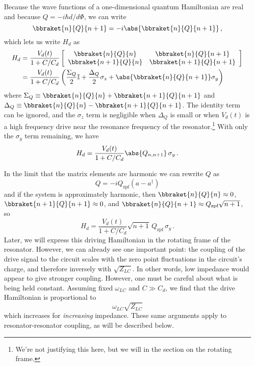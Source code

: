 Because the wave functions of a one-dimensional quantum Hamiltonian are real and because $Q = -i \hbar d/d\Phi$, we can write
\begin{equation*}
  \bbraket{n}{Q}{n+1} = -i \abs{\bbraket{n}{Q}{n+1}} \, ,
\end{equation*}
which lets us write $H_d$ as
\begin{align*}
  H_d
  &= \frac{V_d(t)}{1 + C / C_d}
    \left[ \begin{array}{cc}
      \bbraket{n}{Q}{n} & \bbraket{n}{Q}{n+1} \\
      \bbraket{n+1}{Q}{n} & \bbraket{n+1}{Q}{n+1}
    \end{array}\right] \\
  &= \frac{V_d(t)}{1 + C / C_d} \left(
      \frac{\Sigma_Q}{2} \mathbb{I}
    + \frac{\Delta_Q}{2} \sigma_z
    + \abs{\bbraket{n}{Q}{n+1}} \sigma_y
  \right)
\end{align*}
where $\Sigma_Q \equiv \bbraket{n}{Q}{n} + \bbraket{n+1}{Q}{n+1}$ and $\Delta_Q \equiv \bbraket{n}{Q}{n} - \bbraket{n+1}{Q}{n+1}$.
The identity term can be ignored, and the $\sigma_z$ term is negligible when $\Delta_Q$ is small or when $V_d(t)$ is a high frequency drive near the resonance frequency of the resonator.\footnote{We're not justifying this here, but we will in the section on the rotating frame.}
With only the $\sigma_y$ term remaining, we have
\begin{equation}
  H_d = \frac{V_d(t)}{1 + C/C_d} \abs{Q_{n,n+1}} \, \sigma_y \, .
\end{equation}

In the limit that the matrix elements are harmonic we can rewrite $Q$ as
\begin{equation*}
  Q = -i Q_\text{zpf} (a - a^\dagger)
\end{equation*}
and if the system is approximately harmonic, then $\bbraket{n}{Q}{n} \approx 0$, $\bbraket{n+1}{Q}{n+1} \approx 0$, and $\bbraket{n}{Q}{n+1} \approx Q_\text{zpf} \sqrt{n+1}$, so
\begin{equation*}
  H_d = \frac{V_d(t)}{1 + C / C_d} \sqrt{n+1} \, Q_\text{zpf} \, \sigma_y
  \, .
\end{equation*}
Later, we will express this driving Hamiltonian in the rotating frame of the resonator.
However, we can already see one important point: the coupling of the drive signal to the circuit scales with the zero point fluctuations in the circuit's charge, and therefore inversely with $\sqrt{Z_{LC}}$.
In other words, low impedance would appear to give stronger coupling.
However, one must be careful about what is being held constant.
Assuming fixed $\omega_{LC}$ and $C \gg C_d$, we find that the drive Hamiltonian is proportional to
\begin{equation*}
  \omega_{LC} \sqrt{Z_{LC}}
\end{equation*}
which increases for \emph{increasing} impedance.
These same arguments apply to resonator-resonator coupling, as will be described below.

